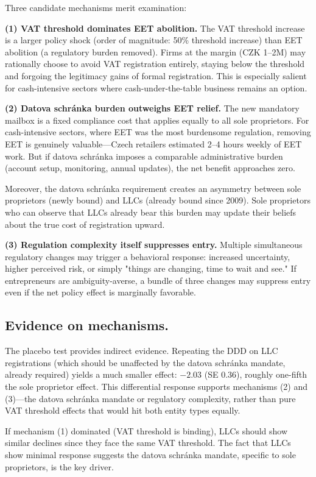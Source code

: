 \documentclass[12pt]{article}
\begin{document}
Three candidate mechanisms merit examination:

\textbf{(1) VAT threshold dominates EET abolition.} The VAT threshold increase is a larger policy shock (order of magnitude: 50\% threshold increase) than EET abolition (a regulatory burden removed). Firms at the margin (CZK 1--2M) may rationally choose to avoid VAT registration entirely, staying below the threshold and forgoing the legitimacy gains of formal registration. This is especially salient for cash-intensive sectors where cash-under-the-table business remains an option.

\textbf{(2) Datova schr\'{a}nka burden outweighs EET relief.} The new mandatory mailbox is a fixed compliance cost that applies equally to all sole proprietors. For cash-intensive sectors, where EET was the most burdensome regulation, removing EET is genuinely valuable—Czech retailers estimated 2--4 hours weekly of EET work. But if datova schr\'{a}nka imposes a comparable administrative burden (account setup, monitoring, annual updates), the net benefit approaches zero.

Moreover, the datova schr\'{a}nka requirement creates an asymmetry between sole proprietors (newly bound) and LLCs (already bound since 2009). Sole proprietors who can observe that LLCs already bear this burden may update their beliefs about the true cost of registration upward.

\textbf{(3) Regulation complexity itself suppresses entry.} Multiple simultaneous regulatory changes may trigger a behavioral response: increased uncertainty, higher perceived risk, or simply "things are changing, time to wait and see." If entrepreneurs are ambiguity-averse, a bundle of three changes may suppress entry even if the net policy effect is marginally favorable.

\subsection*{Evidence on mechanisms.}
The placebo test provides indirect evidence. Repeating the DDD on LLC registrations (which should be unaffected by the datova schr\'{a}nka mandate, already required) yields a much smaller effect: $-2.03$ (SE 0.36), roughly one-fifth the sole proprietor effect. This differential response supports mechanisms (2) and (3)—the datova schr\'{a}nka mandate or regulatory complexity, rather than pure VAT threshold effects that would hit both entity types equally.

If mechanism (1) dominated (VAT threshold is binding), LLCs should show similar declines since they face the same VAT threshold. The fact that LLCs show minimal response suggests the datova schr\'{a}nka mandate, specific to sole proprietors, is the key driver.
\end{document}
